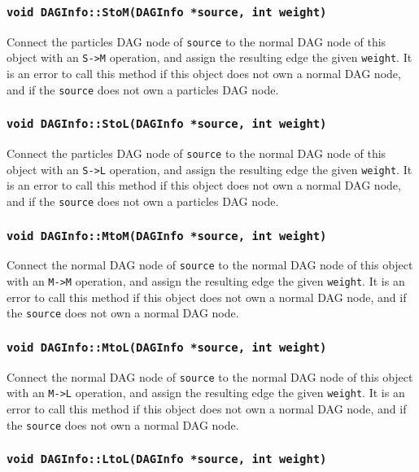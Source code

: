 \subsubsection{\texttt{void DAGInfo::StoM(DAGInfo *source, int weight)}}

Connect the particles DAG node of \texttt{source} to the normal DAG node of
this object with an \texttt{S->M} operation, and assign the resulting edge the
given \texttt{weight}. It is an error to call this method if this object does
not own a normal DAG node, and if the \texttt{source} does not own a particles
DAG node.

\subsubsection{\texttt{void DAGInfo::StoL(DAGInfo *source, int weight)}}

Connect the particles DAG node of \texttt{source} to the normal DAG node of
this object with an \texttt{S->L} operation, and assign the resulting edge the
given \texttt{weight}. It is an error to call this method if this object does
not own a normal DAG node, and if the \texttt{source} does not own a particles
DAG node.

\subsubsection{\texttt{void DAGInfo::MtoM(DAGInfo *source, int weight)}}

Connect the normal DAG node of \texttt{source} to the normal DAG node of
this object with an \texttt{M->M} operation, and assign the resulting edge the
given \texttt{weight}. It is an error to call this method if this object does
not own a normal DAG node, and if the \texttt{source} does not own a normal
DAG node.

\subsubsection{\texttt{void DAGInfo::MtoL(DAGInfo *source, int weight)}}

Connect the normal DAG node of \texttt{source} to the normal DAG node of
this object with an \texttt{M->L} operation, and assign the resulting edge the
given \texttt{weight}. It is an error to call this method if this object does
not own a normal DAG node, and if the \texttt{source} does not own a normal
DAG node.

\subsubsection{\texttt{void DAGInfo::LtoL(DAGInfo *source, int weight)}}

